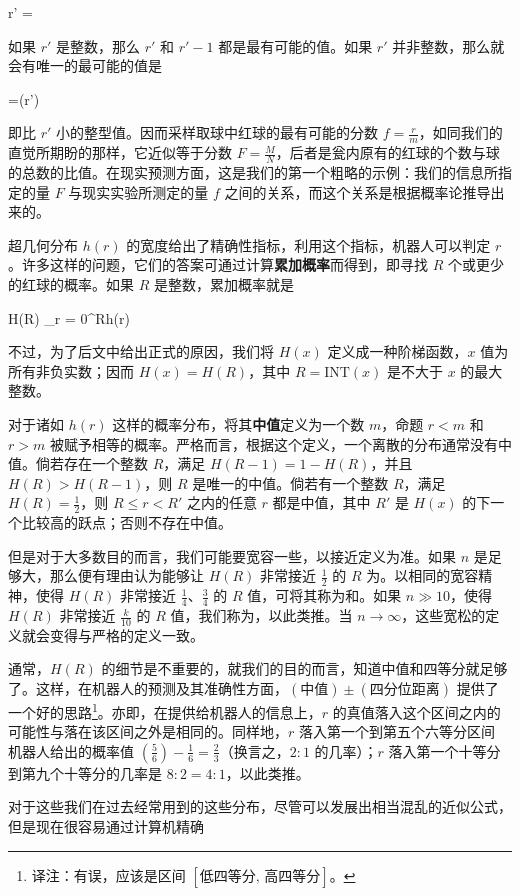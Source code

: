 \placeformula[3-26]
\startformula
r' = 
\stopformula

如果 $r'$ 是整数，那么 $r'$ 和 $r' - 1$ 都是最有可能的值。如果 $r'$ 并非整数，那么就会有唯一的最可能的值是

\placeformula[3-27]
\startformula
{}=(r')
\stopformula

即比 $r'$ 小的整型值。因而采样取球中红球的最有可能的分数 $f = \frac{r}{m}$，如同我们的直觉所期盼的那样，它近似等于分数 $F = \frac{M}{N}$，后者是瓮内原有的红球的个数与球的总数的比值。在现实预测方面，这是我们的第一个粗略的示例：我们的信息所指定的量 $F$ 与现实实验所测定的量 $f$ 之间的关系，而这个关系是根据概率论推导出来的。

超几何分布 $h(r)$ 的宽度给出了精确性指标，利用这个指标，机器人可以判定 $r$。许多这样的问题，它们的答案可通过计算{\bf 累加概率}而得到，即寻找 $R$ 个或更少的红球的概率。如果 $R$ 是整数，累加概率就是

\placeformula[3-28]
\startformula
H(R) \equiv\sum_{r = 0}^Rh(r)
\stopformula

不过，为了后文中给出正式的原因，我们将 $H(x)$ 定义成一种阶梯函数，$x$ 值为所有非负实数；因而 $H(x)=H(R)$，其中 $R = \text{INT}(x)$ 是不大于 $x$ 的最大整数。

对于诸如 $h(r)$ 这样的概率分布，将其{\bf 中值}定义为一个数 $m$，命题 $r < m$ 和 $r > m$ 被赋予相等的概率。严格而言，根据这个定义，一个离散的分布通常没有中值。倘若存在一个整数 $R$，满足 $H(R - 1) = 1 - H(R)$，并且 $H(R) > H(R - 1)$，则 $R$ 是唯一的中值。倘若有一个整数 $R$，满足 $H(R) = \frac{1}{2}$，则 $R\le r < R'$ 之内的任意 $r$ 都是中值，其中 $R'$ 是 $H(x)$ 的下一个比较高的跃点；否则不存在中值。

但是对于大多数目的而言，我们可能要宽容一些，以接近定义为准。如果 $n$ 是足够大，那么便有理由认为能够让 $H(R)$ 非常接近 $\frac{1}{2}$ 的 $R$ 为。以相同的宽容精神，使得 $H(R)$ 非常接近 $\frac{1}{4}$、$\frac{3}{4}$ 的 $R$ 值，可将其称为和。如果 $n \gg 10$，使得 $H(R)$ 非常接近 $\frac{k}{10}$ 的 $R$ 值，我们称为，以此类推。当 $n \rightarrow \infty$，这些宽松的定义就会变得与严格的定义一致。

通常，$H(R)$ 的细节是不重要的，就我们的目的而言，知道中值和四等分就足够了。这样，在机器人的预测及其准确性方面，$(\text{中值})\pm (\text{四分位距离})$ 提供了一个好的思路\footnote{译注：有误，应该是区间 $[\text{低四等分},\,\text{高四等分}]$。}。亦即，在提供给机器人的信息上，$r$ 的真值落入这个区间之内的可能性与落在该区间之外是相同的。同样地，$r$ 落入第一个到第五个六等分区间 机器人给出的概率值 $(\frac{5}{6}) - \frac{1}{6} = \frac{2}{3}$（换言之，$2:1$ 的几率）；$r$ 落入第一个十等分到第九个十等分的几率是 $8:2 = 4:1$，以此类推。

对于这些我们在过去经常用到的这些分布，尽管可以发展出相当混乱的近似公式，但是现在很容易通过计算机精确
